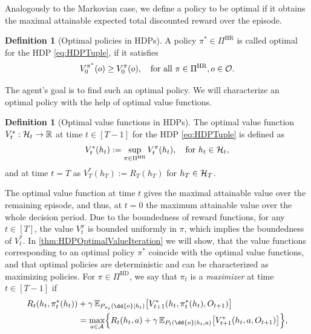 \documentclass[
    a4paper,
    11pt,
    bibliography=totoc,
    listof=totoc,      
    headinclude=true,
    cleardoublepage=empty,
]{scrbook}
\theoremstyle{plain}
\theoremstyle{definition}
\newtheorem{definition}[theorem]{Definition}
\theoremstyle{remark}
\newcommand{\SetR}{\mathbb R}
\newcommand{\E}{\mathbb E}
\newcommand{\SpaceA}{{\cal A}}
\newcommand{\SpaceO}{{\cal O}}
\newcommand{\SpaceH}{{\cal H}}
\begin{document}
Analogously to the Markovian case, we define a policy to be optimal if it obtains
the maximal attainable expected total discounted reward over the episode. 
\begin{definition}[Optimal policies in HDPs]
\label{def:HDPOptimalPolicy}
    A policy $\pi^*\in\Pi^\text{HR}$ is called optimal for the HDP 
    \eqref{eq:HDPTuple}, if it satisfies
    \[
        V^{\pi^*}_0(o) \geq V^\pi_0(o),
        \quad \text{for all } \pi\in\Pi^\text{HR}, o\in\SpaceO.
    \]
\end{definition}

The agent's goal is to find such an optimal policy. We will characterize an
optimal policy with the help of optimal value functions.  

\begin{definition}[Optimal value functions in HDPs]
\label{def:HDPOptimalValueFunctions}
    The optimal value function $V^*_t:\SpaceH_t\to\SetR$ at time $t\in[T-1]$ 
    for the HDP \eqref{eq:HDPTuple} is defined as 
    \begin{equation}
    \label{eq:HDPOptimalValueFunction}
        V_t^*(h_t) := \sup_{\pi\in\Pi^\text{HR}} V^\pi_t(h_t),
        \quad \text{for } h_t\in\SpaceH_t,
    \end{equation}
    and at time $t=T$ as $V_T^*(h_T) := R_T(h_T)$ for $h_T\in \SpaceH_T$.  
\end{definition}
The optimal value function at time $t$ gives the maximal attainable value over
the remaining episode, and thus, at $t=0$ the maximum attainable value over the
whole decision period. Due to the boundedness of reward functions, for any 
$t\in[T]$, the value $V_t^\pi$ is bounded uniformly in $\pi$, which implies 
the boundedness of $V^*_t$. 
In \cref{thm:HDPOptimalValueIteration} we will show, that the
value functions corresponding to an optimal policy $\pi^*$ coincide with the
optimal value functions, and that optimal policies are deterministic and can 
be characterized as maximizing policies. For $\pi\in\Pi^\text{HD}$, we say 
that $\pi_t$ is a \textit{maximizer} at time $t\in[T-1]$ if
\begin{equation}
\label{eq:HDPMaximizerPolicy}    
    \begin{aligned}
        R_t(h_t,\pi^*_t(h_t)) 
        &+ \gamma \, \E_{P_{\pi_t}(\dd{o}|h_t)} \bigl[ 
            V^*_{t+1}(h_t,\pi^*_t(h_t), O_{t+1}) 
        \bigr] \\  
        &= 
        \max_{a\in\SpaceA} \Bigl\{
            R_t(h_t, a) + \gamma \,
            \E_{P_t(\dd{o}|h_t,a)} \bigl[ V^*_{t+1}(h_t, a, O_{t+1}) \bigr]
        \Bigr\},
    \end{aligned}
\end{equation}
\end{document}
